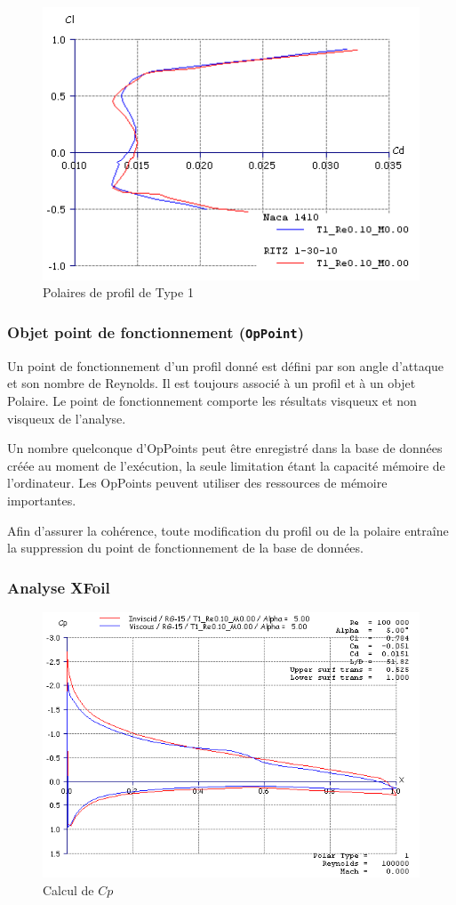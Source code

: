 \documentclass[a4paper,twoside,12pt,dvips]{article}
\begin{document}
\begin{figure}[H]
  \centering
  \includegraphics[width=0.8\linewidth]{img-02}
  \caption{Polaires de profil de Type 1}
  \label{img:polaire_type_1}
\end{figure}

\subsubsection{Objet point de fonctionnement (\texttt{OpPoint})}

Un point de fonctionnement d’un profil donné est défini par son angle 
d’attaque et son nombre de Reynolds. Il est toujours associé à un profil
et à un objet Polaire. Le point de fonctionnement comporte les résultats
visqueux et non visqueux de l’analyse.

Un nombre quelconque d’OpPoints peut être enregistré dans la base de 
données créée au moment de l’exécution, la seule limitation étant la
capacité mémoire de l’ordinateur. Les OpPoints peuvent utiliser des
ressources de mémoire importantes. 

Afin d’assurer la cohérence, toute modification du profil ou de la polaire 
entraîne la suppression du point de fonctionnement de la base de données.
\clearpage
\subsubsection{Analyse XFoil}

\begin{figure}[H]
  \centering
  \includegraphics[width=0.8\linewidth]{img-03}
  \caption{Calcul de $Cp$}
  \label{img:calcul_Cp}
\end{figure}
\end{document}
